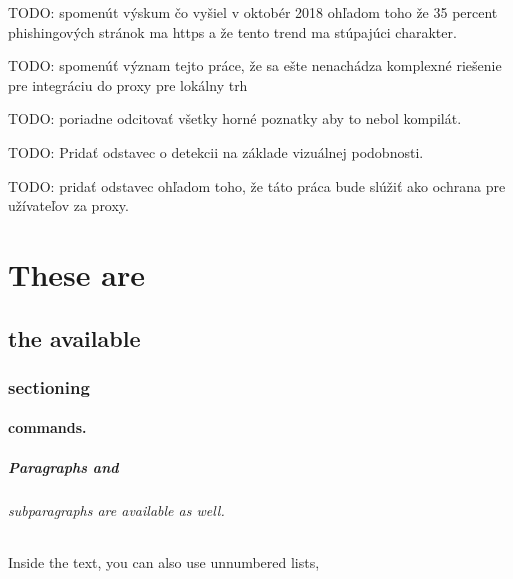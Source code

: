 \documentclass[
  digital, %
  twoside, %
  table,   %
  nolof,     %
  nolot,     %
]{fithesis3}
\begin{document}
TODO: spomenút výskum čo vyšiel v oktobér 2018 ohľadom toho že 35 percent phishingových stránok ma https a že tento trend ma stúpajúci charakter.

TODO: spomenúť význam tejto práce, že sa ešte nenachádza komplexné riešenie pre integráciu do proxy pre lokálny trh

TODO: poriadne odcitovať všetky horné poznatky aby to nebol kompilát.

TODO: Pridať odstavec o detekcii na základe vizuálnej podobnosti.

TODO: pridať odstavec ohľadom toho, že táto práca bude slúžiť ako ochrana pre užívateľov za proxy.

\chapter{These are}
\section{the available}
\subsection{sectioning}
\subsubsection{commands.}
\paragraph{Paragraphs and}
\subparagraph{subparagraphs are available as well.}
Inside the text, you can also use unnumbered lists,
\end{document}
